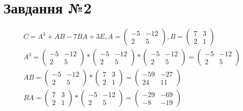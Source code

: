 \documentclass{report}
\begin{document}
\section{Завдання №2}
\begin{equation}\label{eq2}\begin{split}
	& C = A^{3} + AB -7BA + 3E, A = \begin{pmatrix}-5 & -12\\ 2 & 5\end{pmatrix}, B = \begin{pmatrix}7 & 3\\2 & 1\end{pmatrix} \\
	& A^{3} = \begin{pmatrix}-5 & -12\\ 2 & 5\end{pmatrix} * \begin{pmatrix}-5 & -12\\ 2 & 5\end{pmatrix} * \begin{pmatrix}-5 & -12\\ 2 & 5\end{pmatrix} = \begin{pmatrix}-5 & -12\\ 2 & 5\end{pmatrix} \\
	& AB = \begin{pmatrix}-5 & -12\\ 2 & 5\end{pmatrix} * \begin{pmatrix}7 & 3\\2 & 1\end{pmatrix} = \begin{pmatrix}-59 & -27\\24 & 11\end{pmatrix} \\
	& BA = \begin{pmatrix}7 & 3\\2 & 1\end{pmatrix} *  \begin{pmatrix}-5 & -12\\ 2 & 5\end{pmatrix} =  \begin{pmatrix}-29 & -69\\ -8 & -19\end{pmatrix} \\

\end{split}
\end{equation}
\end{document}
